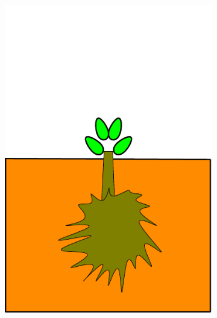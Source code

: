 \documentclass[10pt]{article}
\begin{document}
\begin{figure}
\begin{subfigure}[b]{.1125\linewidth}
\includegraphics[width=1.0\linewidth]{img/tree_pics_6}
\caption{}  %
\label{fig:grow_6}
\end{subfigure}
\begin{subfigure}[b]{.1125\linewidth}
\centering

\end{subfigure}
\end{figure}
\end{document}
